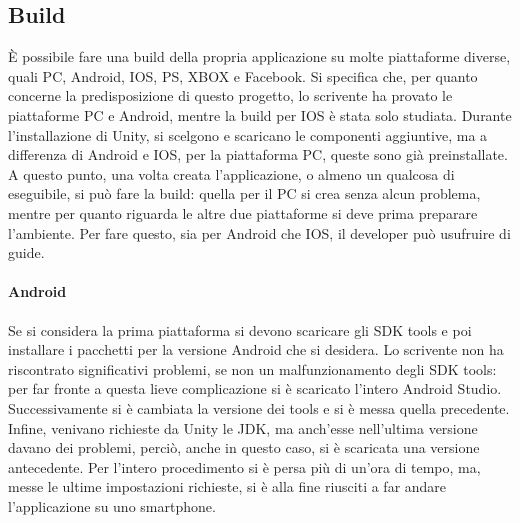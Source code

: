 \subsection{Build}

È possibile fare una build della propria applicazione su molte piattaforme diverse, quali PC, Android, IOS, PS, XBOX e Facebook. Si specifica che, per quanto concerne la predisposizione di questo progetto, lo scrivente ha provato le piattaforme PC e Android, mentre la build per IOS è stata solo studiata.
Durante l’installazione di Unity, si scelgono e scaricano le componenti aggiuntive, ma a differenza di Android e IOS, per la piattaforma PC, queste sono già preinstallate.
A questo punto, una volta creata l’applicazione, o almeno un qualcosa di eseguibile, si può fare la build: quella per il PC si crea senza alcun problema, mentre per quanto riguarda le altre due piattaforme si deve prima preparare l’ambiente. Per fare questo, sia per Android che IOS, il developer può usufruire di guide.
\paragraph{Android}
Se si considera la prima piattaforma si devono scaricare gli SDK tools e poi installare i pacchetti per la versione Android che si desidera. Lo scrivente non ha riscontrato significativi problemi, se non un malfunzionamento degli SDK tools: per far fronte a questa lieve complicazione si è scaricato l’intero Android Studio. Successivamente si è cambiata la versione dei tools e si è messa quella precedente. Infine, venivano richieste da Unity le JDK, ma anch’esse nell’ultima versione davano dei problemi, perciò, anche in questo caso, si è scaricata una versione antecedente. Per l’intero procedimento si è persa più di un’ora di tempo, ma, messe le ultime impostazioni richieste, si è alla fine riusciti a far andare l’applicazione su uno smartphone.
